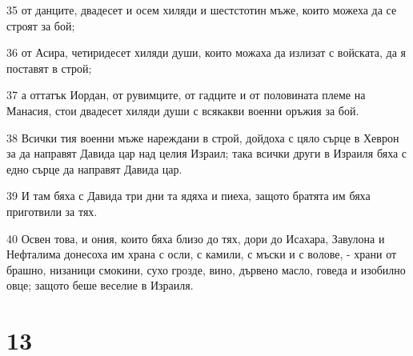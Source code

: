 \par 35 от данците, двадесет и осем хиляди и шестстотин мъже, които можеха да се строят за бой;
\par 36 от Асира, четиридесет хиляди души, които можаха да излизат с войската, да я поставят в строй;
\par 37 а оттатък Иордан, от рувимците, от гадците и от половината племе на Манасия, стои двадесет хиляди души с всякакви военни оръжия за бой.
\par 38 Всички тия военни мъже нареждани в строй, дойдоха с цяло сърце в Хеврон за да направят Давида цар над целия Израил; така всички други в Израиля бяха с едно сърце да направят Давида цар.
\par 39 И там бяха с Давида три дни та ядяха и пиеха, защото братята им бяха приготвили за тях.
\par 40 Освен това, и ония, които бяха близо до тях, дори до Исахара, Завулона и Нефталима донесоха им храна с осли, с камили, с мъски и с волове, - храни от брашно, низаници смокини, сухо грозде, вино, дървено масло, говеда и изобилно овце; защото беше веселие в Израиля.

\chapter{13}

